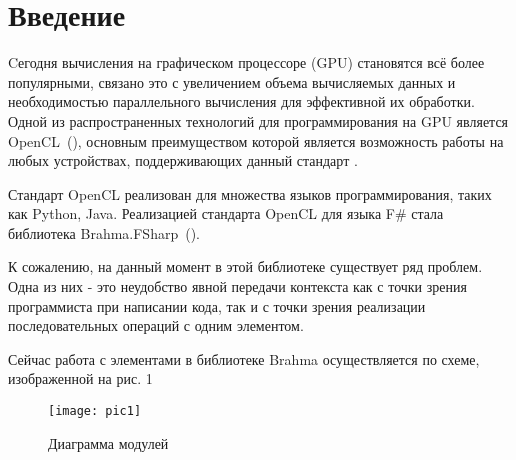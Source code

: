 \documentclass[14pt]{matmex-diploma}
\begin{document}
\maketitle
\tableofcontents
\section*{Введение}
Cегодня вычисления на графическом процессоре (GPU) становятся всё более популярными, связано это с увеличением объема вычисляемых данных и необходимостью параллельного вычисления для эффективной их обработки. Одной из распространенных технологий для программирования на GPU является OpenCL~(\cite{OpenCL}), основным преимуществом которой является возможность работы на любых устройствах, поддерживающих данный стандарт .

Стандарт OpenCL реализован для множества языков программирования, таких как Python, Java. Реализацией стандарта OpenCL для языка F\# стала библиотека Brahma.FSharp~(\cite{Brahma}).

К сожалению, на данный момент в этой библиотеке существует ряд проблем. Одна из них - это неудобство явной передачи контекста как с точки зрения программиста при написании кода, так и с точки зрения реализации последовательных операций с одним элементом.

Сейчас работа с элементами в библиотеке Brahma осуществляется по схеме, изображенной на рис. 1
\begin{figure}[h] 
\label{13}
\centering 
\texttt{[image: pic1]} 
\caption{Диаграмма модулей} 
\end{figure}
\end{document}

